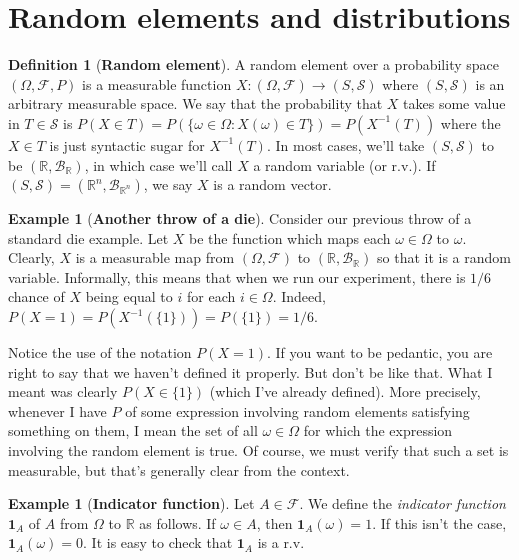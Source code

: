 \documentclass{article}
\theoremstyle{definition}
\newtheorem{definition}[theorem]{Definition}
\newtheorem{example}[theorem]{Example}
\begin{document}
\section{Random elements and distributions}

\begin{definition}[\textbf{Random element}]
    A random element over a probability space $(\Omega, \mathcal{F}, P)$ is a measurable function $X : (\Omega, \mathcal{F}) \to (S, \mathcal{S})$ where $(S, \mathcal{S})$ is an arbitrary measurable space. We say that the probability that $X$ takes some value in $T \in \mathcal{S}$ is $P(X \in T) = P(\{\omega \in \Omega : X(\omega) \in T \}) = P(X^{-1}(T))$ where
    the $X \in T$ is just syntactic sugar for $X^{-1}(T)$. In most cases, we'll take $(S, \mathcal{S})$ to be $(\mathbb{R}, \mathcal{B}_{\mathbb{R}})$, in which case we'll call $X$ a random variable (or r.v.). If $(S, \mathcal{S}) = (\mathbb{R}^n, \mathcal{B}_{\mathbb{R}^n})$, we say $X$ is a random vector.
\end{definition}

\begin{example}[\textbf{Another throw of a die}]
    Consider our previous throw of a standard die example. Let $X$ be the function which maps each $\omega \in \Omega$ to $\omega$. Clearly, $X$ is a measurable map from $(\Omega, \mathcal{F})$ to $(\mathbb{R}, \mathcal{B}_{\mathbb{R}})$ so that it is a random variable. Informally, this means that when we run our experiment, there is $1/6$ chance of $X$
    being equal to $i$ for each $i \in \Omega$. Indeed, $P(X=1) = P(X^{-1}(\{1\})) = P(\{1 \}) = 1/6$.
\end{example}

Notice the use of the notation $P(X=1)$. If you want to be pedantic, you are right to say that we haven't defined it properly.
But don't be like that. What I meant was clearly $P(X \in \{1\})$ (which I've already defined). More precisely, whenever I have $P$ of some expression involving random elements satisfying something on them, I mean the set of all $\omega \in \Omega$ for which the
expression involving the random element is true. Of course, we must verify that such a set is measurable, but that's generally clear from the context.

\begin{example}[\textbf{Indicator function}]
    Let $A \in \mathcal{F}$. We define the \emph{indicator function} $\mathbf{1}_{A}$ of $A$ from $\Omega$ to $\mathbb{R}$ as follows. If $\omega \in A$, then $\mathbf{1}_{A}(\omega) = 1$. If this isn't the case, $\mathbf{1}_{A}(\omega) = 0$. It is easy to check that $\mathbf{1}_{A}$ is a r.v.
\end{example}
\end{document}

